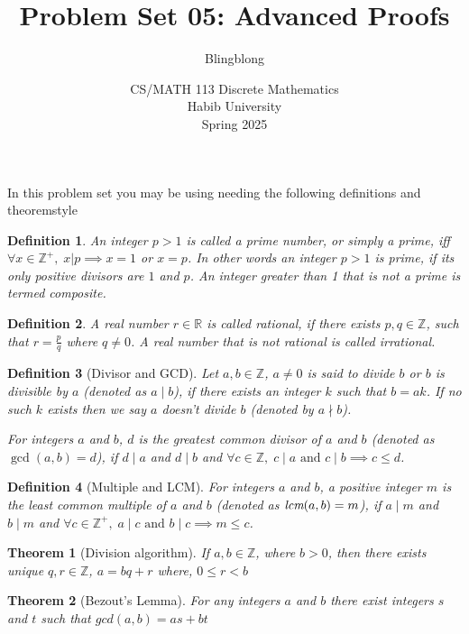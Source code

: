 \documentclass[a4paper]{exam}
\title{Problem Set 05: Advanced Proofs}
\author{Blingblong} %
\date{CS/MATH 113 Discrete Mathematics\\Habib University\\Spring 2025}
\newtheorem{definition}{Definition}
\newtheorem{theorem}{Theorem}
\newcommand{\lcm}{\emph{lcm}}
\begin{document}
\maketitle



    
      

In this problem set you may be using needing the following definitions and theoremstyle
\begin{definition}
    An integer $p>1$ is called a prime number, or simply a prime, iff $\forall x \in \mathbb{Z}^+, \; x|p \implies x = 1$ or $x = p$. In other words an integer $p > 1$ is prime, if its only positive divisors are $1$ and $p$.
    An integer greater than 1 that is not a prime is termed composite.
\end{definition}

\begin{definition}
    A real number $r\in \mathbb{R}$ is called rational, if there exists $p,q\in \mathbb{Z}$, such that $r = \frac{p}{q}$ where $q \neq 0$. A real number that is not rational is called irrational.
\end{definition}

\begin{definition}[Divisor and GCD]
    Let $a, b \in \mathbb{Z}$, $a \neq 0$ is said to divide $b$ or $b$ is divisible by $a$ (denoted as $a \mid b$), if there exists an integer $k$ such that $b = ak$. If no such $k$ exists then we say $a$ doesn't divide $b$ (denoted by $a\nmid b$).

    For integers $a$ and $b$, $d$ is the greatest common divisor of $a$ and $b$ (denoted as $\gcd(a,b) = d$), if $d\mid a$ and $d \mid b$ and $\forall c \in \mathbb{Z}, \;c\mid a \text{ and } c \mid b \implies c\leq d$.
\end{definition}

\begin{definition}[Multiple and LCM]
    For integers $a$ and $b$, a positive integer $m$ is the least common multiple of $a$ and $b$ (denoted as $\lcm(a,b) = m$), if $a\mid m$ and $b \mid m$ and $\forall c \in \mathbb{Z}^+, \;a\mid c \text{ and } b \mid c \implies m\leq c$.
\end{definition}

\begin{theorem}[Division algorithm]
    If $a,b \in \mathbb{Z}$, where $b>0$, then there exists unique $q,r \in \mathbb{Z}$, $a=bq+r$ where, $0 \leq r <b$     
\end{theorem}

\begin{theorem}[Bezout's Lemma]
    For any integers $a$ and $b$ there exist integers $s$ and $t$ such that $gcd(a,b) = as + bt$
\end{theorem}
\end{document}
